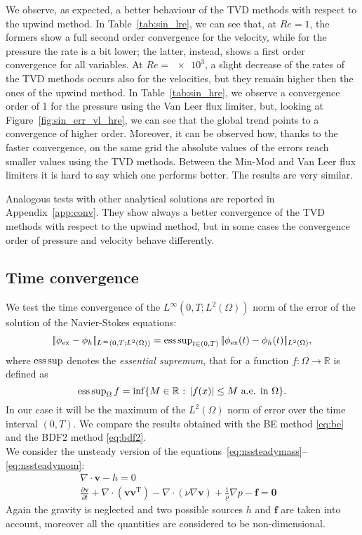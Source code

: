 We observe, as expected, a better behaviour of the TVD methods with respect to 
the upwind method. In Table~\ref{tab:sin_lre}, we can see that, at $Re=1$, the 
formers show a full second order convergence for the velocity, while for the pressure the
rate is a bit lower; the latter, instead, shows a first order convergence for 
all variables. At 
$Re=\num{e3}$, a slight decrease of the rates of the TVD methods occurs also 
for 
the velocities, but they remain higher then the ones of the upwind method. In 
Table~\ref{tab:sin_hre}, we observe a convergence order of 1 for the pressure 
using the Van Leer flux limiter, but, looking at 
Figure~\ref{fig:sin_err_vl_hre}, we can 
see that the global trend points to a convergence of higher order. Moreover, it 
can be observed how, thanks to the faster convergence, on the same grid the 
absolute values of the errors reach smaller values using the TVD methods. 
Between the Min-Mod and Van Leer flux limiters it is hard to say which one 
performs better. The results are very similar.

Analogous tests with other analytical solutions are reported in 
Appendix~\ref{app:conv}. They show always a better convergence of the TVD 
methods with respect to the upwind method, but in some cases the convergence 
order of pressure and velocity behave differently.
%
\subsection{Time convergence}
We test the time convergence of the $L^\infty(0,T;L^2(\Omega))$ norm of the 
error of the solution of the Navier-Stokes equations:
\begin{equation}
	|\!|\phi_\text{ex}-\phi_h|\!|_{L^\infty(0,T;L^2(\Omega))} = \operatorname{ess\,sup}_{t \in 
	(0,T)} |\!|\phi_\text{ex}(t) - \phi_h(t) |\!|_{L^2(\Omega)}, 
\end{equation}
where $\operatorname{ess\,sup}$ denotes the \emph{essential supremum}, that for a function 
$f:\Omega\rightarrow\mathbb{R}$ is defined as
\begin{equation}
	\operatorname{ess\,sup}_\Omega f = \inf \{\text{$M \in \mathbb{R}$ : $ |f(x)| \leq 
	M$ a.e. in $\Omega$} \}.
\end{equation}
In our case it will be the maximum of the $L^2(\Omega)$ norm of error over the 
time interval $(0,T)$. We compare the results 
obtained with the BE method \eqref{eq:be} and the BDF2 method \eqref{eq:bdf2}.\\
We consider the unsteady version of the 
equations~\eqref{eq:nssteadymass}--\eqref{eq:nssteadymom}:
\begin{align}
	\label{eq:nsunsteadymass} \nabla \cdot \mathbf{v} -h = 0&\\
	\label{eq:nsunsteadymom} \frac{\partial \mathbf{v}}{\partial t} +\nabla 
	\cdot (\mathbf{v} \mathbf{v}^\mathrm{T}) - 
	\nabla \cdot (\nu \nabla \mathbf{v}) + \frac{1}{\varrho}\nabla p  
	-\mathbf{f} = \mathbf{0}&
\end{align}
Again the gravity is neglected and two possible sources $h$ and $\mathbf{f}$ 
are taken into account, moreover all the quantities are considered to be 
non-dimensional.
%
